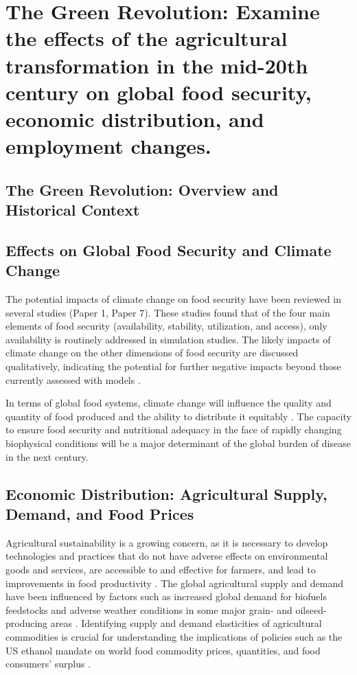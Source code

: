 \documentclass{article}
\begin{document}
\section{The Green Revolution: Examine the effects of the agricultural transformation in the mid-20th century on global food security, economic distribution, and employment changes.}

\subsection{The Green Revolution: Overview and Historical Context}

\subsection{Effects on Global Food Security and Climate Change}

The potential impacts of climate change on food security have been reviewed in several studies (Paper 1, Paper 7). These studies found that of the four main elements of food security (availability, stability, utilization, and access), only availability is routinely addressed in simulation studies. The likely impacts of climate change on the other dimensions of food security are discussed qualitatively, indicating the potential for further negative impacts beyond those currently assessed with models \cite{Schmidhuber2007GlobalFS}. 

In terms of global food systems, climate change will influence the quality and quantity of food produced and the ability to distribute it equitably \cite{Myers2017ClimateCA}. The capacity to ensure food security and nutritional adequacy in the face of rapidly changing biophysical conditions will be a major determinant of the global burden of disease in the next century. 

\subsection{Economic Distribution: Agricultural Supply, Demand, and Food Prices}

Agricultural sustainability is a growing concern, as it is necessary to develop technologies and practices that do not have adverse effects on environmental goods and services, are accessible to and effective for farmers, and lead to improvements in food productivity \cite{Pretty2008AgriculturalSC}. The global agricultural supply and demand have been influenced by factors such as increased global demand for biofuels feedstocks and adverse weather conditions in some major grain- and oilseed-producing areas \cite{Trostle2012GlobalAS}. Identifying supply and demand elasticities of agricultural commodities is crucial for understanding the implications of policies such as the US ethanol mandate on world food commodity prices, quantities, and food consumers' surplus \cite{Roberts2010IdentifyingSA}. 
\end{document}
